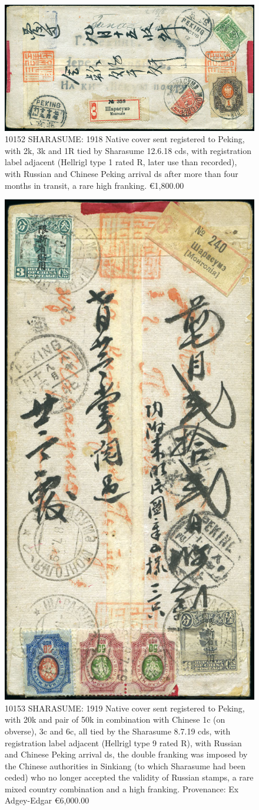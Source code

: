 \begin{figure}[htbp]
\centering
\includegraphics[width=.95\textwidth]{../russian-post-in-mongolia/10152.jpg}
\caption{ 
10152	SHARASUME: 1918 Native cover sent registered to Peking, with 2k, 3k and 
1R tied by Sharasume 12.6.18 cds, with registration label adjacent 
(Hellrigl type 1 rated R, later use than recorded), with Russian and Chinese
Peking arrival ds after more than four months in transit, a rare high franking.
\euro 1,800.00
} 
\end{figure} 

\begin{figure}[htbp]
\centering
\includegraphics[width=.50\textwidth]{../russian-post-in-mongolia/10153.jpg}
\caption{ 
10153	SHARASUME: 1919 Native cover sent registered to Peking, with 20k
and pair of 50k in combination with Chinese 1c (on obverse), 3c and 6c, all
tied by the Sharasume 8.7.19 cds, with registration label adjacent 
(Hellrigl type 9 rated R), with Russian and Chinese Peking arrival ds, 
the double franking was imposed by the Chinese authorities in 
Sinkiang (to which Sharasume had been ceded) who no longer accepted
the validity of Russian stamps, a rare mixed country combination and a high franking.
Provenance: Ex Adgey-Edgar
\euro 6,000.00
} 
\end{figure}

